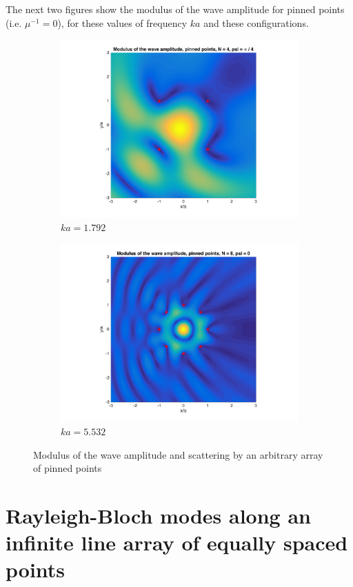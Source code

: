 \documentclass[11pt]{report}
\numberwithin{equation}{section}
\begin{document}
\noindent
The next two figures show the modulus of the wave amplitude for pinned points (i.e. $\mu^{-1} = 0$), for these values of frequency $ka$ and these configurations.
%
\begin{figure}[H]
 
\begin{subfigure}{0.5\textwidth}
\centering
\includegraphics[width=0.8\linewidth]{N4pinned} 
\caption{$ka = 1.792$}
\label{fig:subim1}
\end{subfigure}
\begin{subfigure}{0.5\textwidth}
\centering
\includegraphics[width=0.8\linewidth]{N8pinned}
\caption{$ka = 5.532$}
\label{fig:subim2}
\end{subfigure}
 
\caption{Modulus of the wave amplitude and scattering by an arbitrary array of pinned points}
\label{fig:image2}
\end{figure}

\chapter{Rayleigh-Bloch modes along an infinite line array of equally spaced points} \label{chap:linear}
\end{document}

